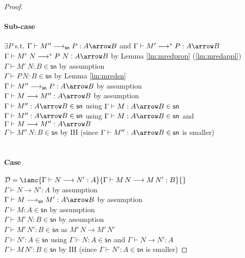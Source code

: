 \documentclass{article}
\newcommand{\csn}{\mathsf{sn}}
\newcommand{\mred}{\longrightarrow^*}
\newcommand{\red}{\longrightarrow}
\newcommand{\redsn}{\longrightarrow_\csn}
\begin{document}
\begin{proof}
\paragraph{Sub-case} $\exists P$ s.t. $\Gamma \vdash M'' \redsn P : A \arrow B$ and $\Gamma \vdash M' \mred P: A \arrow B$
\\[1em]
$\Gamma \vdash M'~N \mred P~N : A \arrow B$ \hfill by Lemma \ref{lm:mredprop} (\ref{lm:mredappl}) \\
$\Gamma \vdash M'~N : B \in \csn$ \hfill by assumption \\
$\Gamma \vdash P\,N : B \in \csn$ \hfill by Lemma \ref{lm:mredsn} \\
$\Gamma \vdash M'' \redsn P : A \arrow B$ \hfill by assumption \\
$\Gamma \vdash M \red M'' : A \arrow B$ \hfill by assumption \\
$\Gamma \vdash M'' : A \arrow B \in \csn$ \hfill using $\Gamma \vdash M : A \arrow B \in \csn$ \\
$\Gamma \vdash M'': A \arrow B \in \csn$ \hfill using $\Gamma \vdash M : A \arrow B \in \csn$ and $\Gamma \vdash M \red M'' : A \arrow B$\\
$\Gamma \vdash M''\,N : B \in \csn$ \hfill by IH (since $\Gamma \vdash M'': A \arrow B \in \csn$ is smaller) \\
\\[0.5em]

\paragraph{Case} $\mathcal{D} = \ianc{\Gamma \vdash N \red N' : A}{\Gamma \vdash M\,N \red M\,N': B}{}$
\\[1em]
$\Gamma \vdash N \red N' : A $ \hfill by assumption \\
$\Gamma \vdash M \redsn M' : A \arrow B$ \hfill by assumption \\
$\Gamma \vdash M: A \in \csn$ \hfill  by assumption\\
$\Gamma \vdash M'\,N : B \in \csn$ \hfill by assumption\\
$\Gamma \vdash M'\,N': B \in \csn$ \hfill as $M'\,N \red M'\,N'$\\
$\Gamma \vdash N' : A \in \csn$ \hfill using $\Gamma \vdash N : A \in \csn$ and $\Gamma \vdash N \red N' : A$\\
$\Gamma \vdash M\,N' : B \in \csn$ \hfill by IH (since $\Gamma \vdash N': A \in \csn$ is smaller)

\end{proof}
\end{document}
